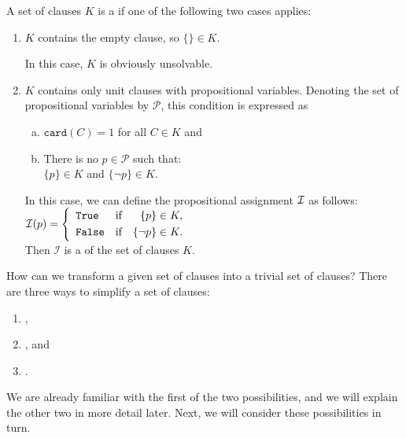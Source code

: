 \begin{Definition}
  A set of clauses $K$ is a  if one of the following two cases applies:
  \begin{enumerate}
  \item $K$ contains the empty clause, so $\{\} \in K$.

        In this case, $K$ is obviously unsolvable.
  \item $K$ contains only unit clauses with \underline{} propositional variables.
        Denoting the set of propositional variables by $\mathcal{P}$,
        this condition is expressed as 
        \begin{enumerate}[(a)]
        \item $\texttt{card}(C) = 1$ \quad for all $C \in K$ \quad and
        \item There is no $p \in \mathcal{P}$ such that: 
              \\[0.2cm]
              \hspace*{1.3cm}
              $\{p\} \in K$ \quad and \quad $\{\neg p\} \in K$.
        \end{enumerate}
        In this case, we can define the propositional assignment $\mathcal{I}$ as follows:
        \\[0.2cm]
        \hspace*{1.3cm}
        $\mathcal{I}(p) = \left\{
                   \begin{array}{lcr}
                     \texttt{True}  & \mbox{if} & \{p\}      \in K, \\[0.1cm]
                     \texttt{False} & \mbox{if} & \{\neg p\} \in K.
                   \end{array}
                 \right.
        $
        \\[0.2cm]
        Then $\mathcal{I}$ is a  of the set of clauses $K$. \eox
  \end{enumerate}
\end{Definition}

How can we transform a given set of clauses into a trivial set of clauses?
There are three ways to simplify a set of clauses:
\begin{enumerate}
\item {},
\item {}, and
\item {}.
\end{enumerate}
We are already familiar with the first of the two
possibilities, and we will explain the other two in more detail later.
Next, we will consider these possibilities in turn.

